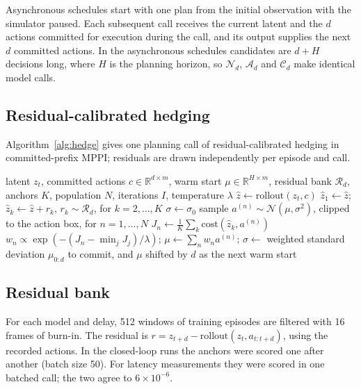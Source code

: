 \documentclass[pdflatex,sn-nature]{sn-jnl}%
\begin{document}
Asynchronous schedules start with one plan from the initial observation with the simulator paused. Each subsequent call receives the current latent and the $d$ actions committed for execution during the call, and its output supplies the next $d$ committed actions. In the asynchronous schedules candidates are $d+H$ decisions long, where $H$ is the planning horizon, so $\mathcal{N}_d$, $\mathcal{A}_d$ and $\mathcal{C}_d$ make identical model calls.

\subsection{Residual-calibrated hedging}\label{sec:method}

Algorithm~\ref{alg:hedge} gives one planning call of residual-calibrated hedging in committed-prefix MPPI; residuals are drawn independently per episode and call.

\begin{algorithm}[t]
\caption{Residual-calibrated hedging in committed-prefix MPPI (one call)}\label{alg:hedge}
\begin{algorithmic}[1]
\Require latent $z_t$, committed actions $c\in\mathbb{R}^{d\times m}$, warm start $\mu\in\mathbb{R}^{H\times m}$, residual bank $\mathcal{R}_d$, anchors $K$, population $N$, iterations $I$, temperature $\lambda$
\State $\hat z \gets \mathrm{rollout}(z_t, c)$ 
\State $\hat z_1 \gets \hat z$; $\hat z_k \gets \hat z + r_k$, $r_k\sim\mathcal{R}_d$, for $k=2,\dots,K$
\State $\sigma\gets\sigma_0$
  \State sample $a^{(n)}\sim\mathcal{N}(\mu,\sigma^2)$, clipped to the action box, for $n=1,\dots,N$
  \State $J_n \gets \frac{1}{K}\sum_{k} \mathrm{cost}(\hat z_k, a^{(n)})$ 
  \State $w_n\propto\exp(-(J_n-\min_j J_j)/\lambda)$; $\mu\gets\sum_n w_n a^{(n)}$; $\sigma\gets$ weighted standard deviation
\EndFor
\State \Return $\mu_{0:d}$ to commit, and $\mu$ shifted by $d$ as the next warm start
\end{algorithmic}
\end{algorithm}

\subsection{Residual bank}\label{sec:bank}

For each model and delay, 512 windows of training episodes are filtered with 16 frames of burn-in. The residual is $r=z_{t+d}-\mathrm{rollout}(z_t,a_{t:t+d})$, using the recorded actions. In the closed-loop runs the anchors were scored one after another (batch size 50). For latency measurements they were scored in one batched call; the two agree to $6\times10^{-6}$.
\end{document}
